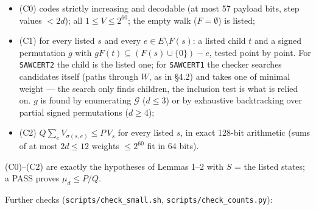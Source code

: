 \documentclass[11pt,a4paper]{report}
\begin{document}
\begin{itemize}
\tightlist
\item
  (C0) codes strictly increasing and decodable (at most 57 payload bits, step values \(<2d\)); all
  \(1\le V\le2^{60}\); the empty walk (\(F=\emptyset\)) is listed;
\item
  (C1) for every listed \(s\) and every \(e\in E\setminus F(s)\): a listed child \(t\) and a signed permutation \(g\)
  with \(gF(t)\subseteq(F(s)\cup\{0\})-e\), tested point by point. For \texttt{SAWCERT2} the child is the listed one; for
  \texttt{SAWCERT1} the checker searches candidates itself (paths through \(W\), as in §4.2) and takes one of minimal weight
  --- the search only finds children, the inclusion test is what is relied on. \(g\) is found by enumerating
  \(\mathcal G\) (\(d\le3\)) or by exhaustive backtracking over partial signed permutations (\(d\ge4\));
\item
  (C2) \(Q\sum_e V_{\sigma(s,e)}\le P\,V_s\) for every listed \(s\), in exact 128-bit arithmetic (sums of at most
  \(2d\le12\) weights \(\le2^{60}\) fit in 64 bits).
\end{itemize}

(C0)--(C2) are exactly the hypotheses of Lemmas 1--2 with \(S\) = the listed states; a PASS proves
\(\mu_d\le P/Q\).

Further checks (\texttt{scripts/check\_small.sh}, \texttt{scripts/check\_counts.py}):
\end{document}
